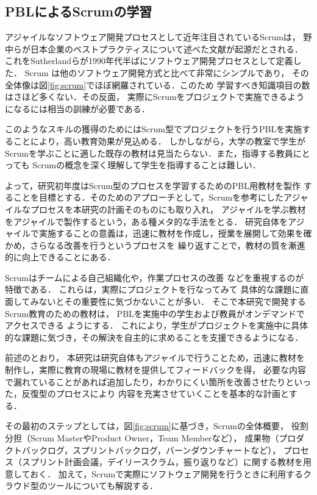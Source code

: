 \documentclass[a4j,9pt,twoside,twocolumn]{jsarticle}
\begin{document}
\subsection{PBLによるScrumの学習}
	
	アジャイルなソフトウェア開発プロセスとして近年注目されているScrumは，
	野中らが日本企業のベストプラクティスについて述べた文献\cite{nonaka}が起源だとされる．
	これをSutherlandらが1990年代半ばにソフトウェア開発プロセスとして定義した．
	Scrum は他のソフトウェア開発方式と比べて非常にシンプルであり，
	その全体像は図\ref{fig:scrum}でほぼ網羅されている．このため
	学習すべき知識項目の数はさほど多くない．その反面，
	実際にScrumをプロジェクトで実施できるようになるには相当の訓練が必要である．

	このようなスキルの獲得のためにはScrum型でプロジェクトを行うPBLを実施することにより，高い教育効果が見込める．
	しかしながら，大学の教室で学生がScrumを学ぶことに適した既存の教材は見当たらない．また，指導する教員にとっても
	Scrumの概念を深く理解して学生を指導することは難しい．

	よって，研究初年度はScrum型のプロセスを学習するためのPBL用教材を製作
	することを目標とする．そのためのアプローチとして，Scrumを参考にしたアジャイルなプロセスを本研究の計画そのものにも取り入れ，
	アジャイルを学ぶ教材をアジャイルで製作するという，ある種メタ的な手法をとる．
	研究自体をアジャイルで実施することの意義は，迅速に教材を作成し，授業を展開して効果を確かめ，さらなる改善を行うというプロセスを
	繰り返すことで，教材の質を漸進的に向上できることにある．
	
	Scrumはチームによる自己組織化や，作業プロセスの改善
	などを重視するのが特徴である．
	これらは，実際にプロジェクトを行なってみて
	具体的な課題に直面してみないとその重要性に気づかないことが多い．
	そこで本研究で開発するScrum教育のための教材は，
	PBLを実施中の学生および教員がオンデマンドでアクセスできる
	ようにする．
	これにより，学生がプロジェクトを実施中に具体的な課題に気づき，その解決を自主的に求めることを支援できるようになる．
	
	前述のとおり，
	本研究は研究自体もアジャイルで行うことため，迅速に教材を制作し，実際に教育の現場に教材を提供してフィードバックを得，
	必要な内容で漏れていることがあれば追加したり，わかりにくい箇所を改善させたりといった，反復型のプロセスにより
	内容を充実させていくことを基本的な計画とする．
	
	その最初のステップとしては，図\ref{fig:scrum}に基づき，Scrumの全体概要，
	役割分担（Scrum MasterやProduct Owner，Team Memberなど），
	成果物（プロダクトバックログ，スプリントバックログ，バーンダウンチャートなど），
	プロセス（スプリント計画会議，デイリースクラム，振り返りなど）に関する教材を用意しておく．
	加えて，Scrumで実際にソフトウェア開発を行うときに利用するクラウド型のツールについても解説する．
\end{document}
